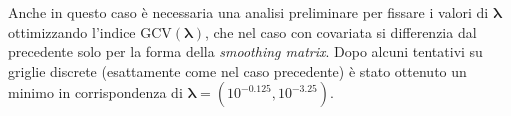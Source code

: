 \documentclass[a4paper,11pt,twoside,openright]{book}							%
\begin{document}
Anche in questo caso è necessaria una analisi preliminare per fissare i valori di $\bm \lambda$ ottimizzando l'indice $\mathrm{GCV}(\bm \lambda)$, che nel caso con covariata si differenzia dal precedente solo per la forma della \textit{smoothing matrix}. Dopo alcuni tentativi su griglie discrete (esattamente come nel caso precedente) è stato ottenuto un minimo in corrispondenza di $\bm \lambda = (10^{-0.125}, 10^{-3.25})$. 
\newpage
\begin{figure}[H]
\centering
{}
\end{figure}
\end{document}
